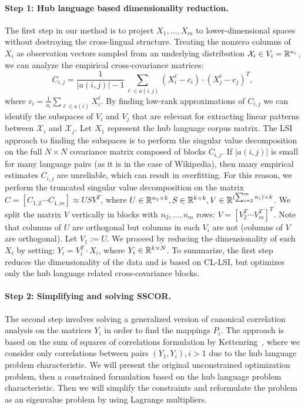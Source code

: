 \paragraph{Step 1: Hub language based dimensionality reduction.}
The first step in our method is to project $X_1, \ldots, X_m$ to lower-dimensional spaces 
without destroying the cross-lingual structure. Treating the nonzero columns of $X_i$ as 
observation vectors sampled from an underlying distribution $\mathcal{X}_i \in V_i = \mathbb{R}^{n_i}$, 
we can analyze the empirical cross-covariance matrices: 
$$C_{i,j} = \frac{1}{|a(i,j)|-1 }\sum_{\ell \in a(i,j)} (X_i^{\ell} - c_i)\cdot (X_j^{\ell} - c_j)^T,$$
where $c_i = \frac{1}{a_i} \sum_{\ell \in a(i)}X_i^{\ell}$. By finding low-rank 
approximations of $C_{i,j}$ we can identify the subspaces of $V_i$ and $V_j$ that are 
relevant for extracting linear patterns between $\mathcal{X}_i$ and $\mathcal{X}_j$. 
Let $X_1$ represent the hub language corpus matrix. The LSI approach to finding the subspaces 
is to perform the singular value decomposition on the full $N \times N$ covariance matrix 
composed of blocks $C_{i,j}$. If $|a(i,j)|$ is small for many language pairs (as it is in the 
case of Wikipedia), then many empirical estimates $C_{i,j}$ are unreliable, which can result 
in overfitting. For this reason, we perform the truncated singular value decomposition on the 
matrix $C = [C_{1,2}  \cdots  C_{1,m}] \approx U S V^T$, where 
$U \in \mathbb{R}^{n_1 \times k}, S \in \mathbb{R}^{k \times k}, V \in \mathbb{R}^{(\sum_{i=2}^m n_i) \times k}$. 
We split the matrix $V$ vertically in blocks with 
$n_2, \ldots, n_m$ rows: $V = [V_2^T  \cdots  V_m^T]^T$. 
Note that columns of $U$ are orthogonal but columns in each $V_i$ are not (columns of $V$ 
are orthogonal). Let $V_1 := U$. We proceed by reducing the dimensionality of each $X_i$ by 
setting: $Y_i = V_i^T \cdot X_i$, where $Y_i \in \mathbb{R}^{k\times N}$. To summarize, the first step 
reduces the dimensionality of the data and is based on CL-LSI, but optimizes only the hub language 
related cross-covariance blocks.

\paragraph{Step 2: Simplifying and solving SSCOR.}
The second step involves solving a generalized version of canonical correlation analysis on the 
matrices $Y_i$ in order to find the mappings $P_i$. The approach is based on the sum of 
squares of correlations formulation by Kettenring~\cite{Kettenring}, where we consider only 
correlations between pairs $(Y_1, Y_i), i >1$ due to the hub language problem characteristic.
We will present the original unconstrained optimization problem, then a constrained formulation 
based on the hub language problem characteristic. Then we will simplify the constraints and 
reformulate the problem as an eigenvalue problem by using Lagrange multipliers.


